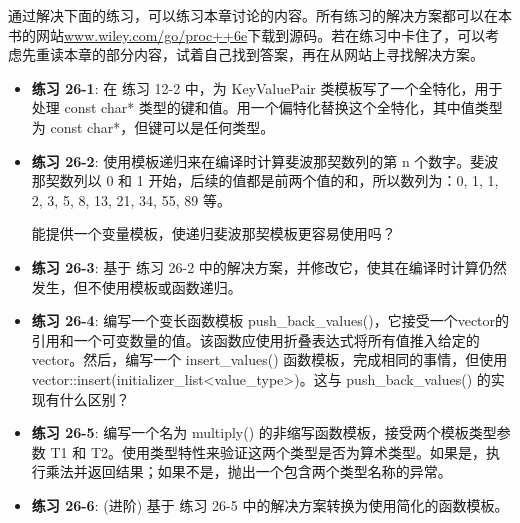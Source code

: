 通过解决下面的练习，可以练习本章讨论的内容。所有练习的解决方案都可以在本书的网站\url{www.wiley.com/go/proc++6e}下载到源码。若在练习中卡住了，可以考虑先重读本章的部分内容，试着自己找到答案，再在从网站上寻找解决方案。

\begin{itemize}
\item
\textbf{练习 26-1}: 在 练习 12-2 中，为 KeyValuePair 类模板写了一个全特化，用于处理 const char* 类型的键和值。用一个偏特化替换这个全特化，其中值类型为 const char*，但键可以是任何类型。

\item
\textbf{练习 26-2}: 使用模板递归来在编译时计算斐波那契数列的第 n 个数字。斐波那契数列以 0 和 1 开始，后续的值都是前两个值的和，所以数列为：0, 1, 1, 2, 3, 5, 8, 13, 21, 34, 55, 89 等。

能提供一个变量模板，使递归斐波那契模板更容易使用吗？

\item
\textbf{练习 26-3}: 基于 练习 26-2 中的解决方案，并修改它，使其在编译时计算仍然发生，但不使用模板或函数递归。

\item
\textbf{练习 26-4}: 编写一个变长函数模板 push\_back\_values()，它接受一个vector的引用和一个可变数量的值。该函数应使用折叠表达式将所有值推入给定的vector。然后，编写一个 insert\_values() 函数模板，完成相同的事情，但使用 vector::insert(initializer\_list<value\_type>)。这与 push\_back\_values() 的实现有什么区别？

\item
\textbf{练习 26-5}: 编写一个名为 multiply() 的非缩写函数模板，接受两个模板类型参数 T1 和 T2。使用类型特性来验证这两个类型是否为算术类型。如果是，执行乘法并返回结果；如果不是，抛出一个包含两个类型名称的异常。

\item
\textbf{练习 26-6}: (进阶) 基于 练习 26-5 中的解决方案转换为使用简化的函数模板。
\end{itemize}




















